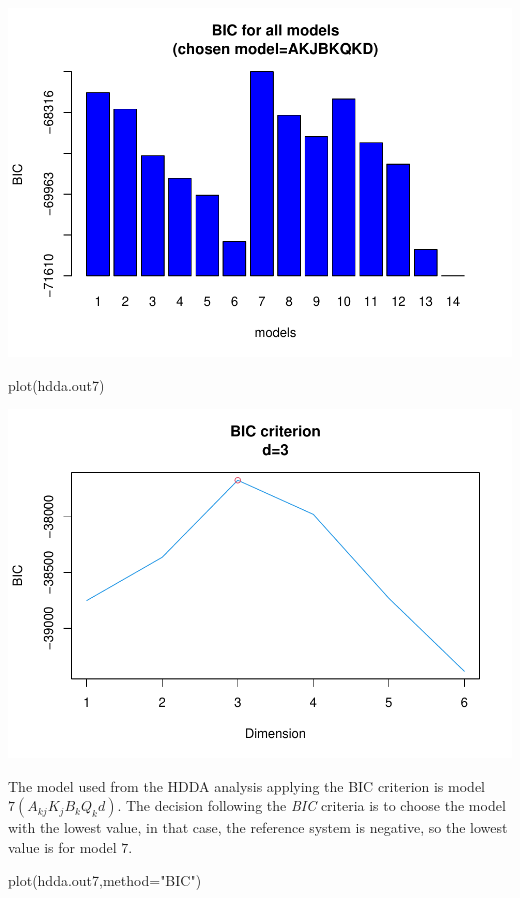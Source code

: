 \documentclass[
  11pt,
]{article}
\newenvironment{Shaded}{\begin{snugshade}}{\end{snugshade}}
\newcommand{\AttributeTok}[1]{\textcolor[rgb]{0.77,0.63,0.00}{#1}}
\newcommand{\FunctionTok}[1]{\textcolor[rgb]{0.00,0.00,0.00}{#1}}
\newcommand{\NormalTok}[1]{#1}
\newcommand{\StringTok}[1]{\textcolor[rgb]{0.31,0.60,0.02}{#1}}
\begin{document}
\includegraphics{report_files/figure-latex/Task_1_11-1.pdf}

\begin{Shaded}
\begin{Highlighting}[]
\FunctionTok{plot}\NormalTok{(hdda.out7)}
\end{Highlighting}
\end{Shaded}

\includegraphics{report_files/figure-latex/Task_1_11-2.pdf}

The model used from the HDDA analysis applying the BIC criterion is model \(7(A_{kj} K_{j} B_{k} Q_{k} d)\). The decision following the \emph{BIC} criteria is to choose the model with the lowest value, in that case, the reference system is negative, so the lowest value is for model \(7\).

\begin{Shaded}
\begin{Highlighting}[]
\FunctionTok{plot}\NormalTok{(hdda.out7,}\AttributeTok{method=}\StringTok{"BIC"}\NormalTok{)}
\end{Highlighting}
\end{Shaded}
\end{document}
